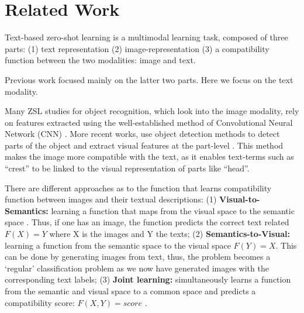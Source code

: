 \documentclass[11pt,a4paper]{article}
\begin{document}
\par


\section{Related Work}

Text-based zero-shot learning is a multimodal learning task, composed of three parts: (1) text representation (2) image-representation (3) a compatibility function between the two modalities: image and text. \par

Previous work focused mainly on the latter two parts. Here we focus on the text modality. \par

Many ZSL  studies \cite{xu2018attngan,lei2015predicting,qiao2016less,akata2016multi} for object recognition, which look into the image modality, rely on features extracted using the well-established method of
Convolutional Neural Network (CNN) \cite{lecun1995convolutional}. More recent works, use object detection methods to detect parts of the object and extract visual features at the part-level \cite{elhoseiny2017link,zhu2018generative,zhang2016spda}. This
method makes the image more compatible with the text, as it enables text-terms such as \enquote{crest} to be linked to the visual representation of parts like \enquote{head}. \par



There are different approaches as to the function that learns compatibility function between images and their textual descriptions: (1) \textbf{Visual-to-Semantics:} learning a function that maps from the visual space to the semantic space \citep{socher2013zero}. Thus, if one has an image, the function predicts the correct text related $F(X)=Y$ where X is the images and Y the texts; (2) \textbf{Semantics-to-Visual:} learning a function from the semantic space to the visual space \citet{zhu2018generative} $F(Y)=X$. This can be done by generating images from text, thus, the problem becomes a \enquote*{regular} classification problem as we now have generated images with the corresponding text labels; (3) \textbf{Joint learning:} simultaneously learns a function from the semantic and visual space to a common space and predicts a compatibility score: $F(X,Y)=score$  \cite{akata2015evaluation,akata2016multi,qiao2016less,elhoseiny2013write,elhoseiny2016write}.\par
\end{document}
